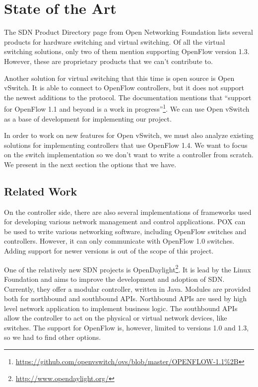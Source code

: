 \chapter{State of the Art}
\label{chapter:sota} 

The SDN Product Directory\cite{onf:products} page from Open Networking Foundation\cite{onf} lists
several products for hardware switching and virtual switching. Of all the virtual switching solutions,
only two of them mention supporting OpenFlow version 1.3. However, these are proprietary products that
we can't contribute to.

Another solution for virtual switching that this time is open source is Open vSwitch. It is able to connect to OpenFlow controllers,
but it does not support the newest additions to the protocol. The documentation mentions that 
``support for OpenFlow 1.1 and beyond is a work in progress''\footnote{\url{https://github.com/openvswitch/ovs/blob/master/OPENFLOW-1.1\%2B}}.
We can use Open vSwitch as a base of development for implementing our project.
 
In order to work on new features for Open vSwitch, we must also analyze existing solutions for implementing controllers
that use OpenFlow 1.4. We want to focus on the switch implementation so we don't want to write a controller from
scratch. We present in the next section the options that we have.
 
\section{Related Work}


On the controller side, there are also several implementations of frameworks used for developing
various network management and control applications. POX\cite{pox} can be used to write various networking software,
including OpenFlow switches and controllers. However, it can only communicate with OpenFlow 1.0 switches.
Adding support for newer versions is out of the scope of this project.

One of the relatively new SDN projects is OpenDaylight\footnote{\url{http://www.opendaylight.org/}}. It is lead by
the Linux Foundation and aims to improve the development and adoption of SDN. Currently, they offer a modular controller,
written in Java. Modules are provided both for northbound and southbound APIs. Northbound APIs are used by high level
network application to implement business logic. The southbound APIs allow the controller to act on the physical or
virtual network devices, like switches. The support for OpenFlow is, however, limited to versions 1.0 and 1.3, so
we had to find other options.

